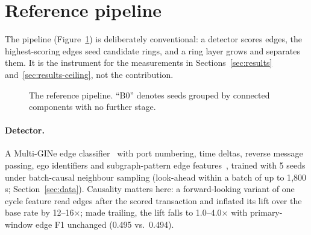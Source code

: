 \section{Reference pipeline}
\label{sec:method}

The pipeline (Figure~\ref{fig:pipeline}) is deliberately conventional: a detector scores
edges, the highest-scoring edges seed candidate rings, and a ring layer grows and separates
them. It is the instrument for the measurements in Sections~\ref{sec:results}
and~\ref{sec:results-ceiling}, not the contribution.

\begin{figure}[t]
\centering
{}
\caption{The reference pipeline. ``B0'' denotes seeds grouped by connected components with no
further stage.}
\label{fig:pipeline}
\end{figure}

\paragraph{Detector.}
A Multi-GINe edge classifier~\citep{egressy2024} with port numbering, time deltas, reverse
message passing, ego identifiers and subgraph-pattern edge features~\citep{blanusa2024},
trained with 5 seeds under batch-causal neighbour sampling (look-ahead within a batch of up to
1{,}800\,s; Section~\ref{sec:data}).
Causality matters here: a forward-looking variant of one cycle feature read edges after the
scored transaction and inflated its lift over the base rate by 12--16$\times$; made trailing,
the lift falls to 1.0--4.0$\times$ with primary-window edge F1 unchanged (0.495 vs.\ 0.494).

